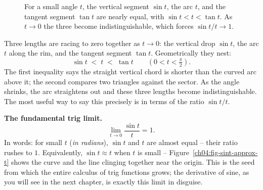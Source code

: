 \begin{figure}[H]
\centering
{}
\caption{For a small angle $t$, the vertical segment $\sin t$, the arc $t$, and the tangent segment $\tan t$ are nearly equal, with $\sin t < t < \tan t$. As $t\to 0$ the three become indistinguishable, which forces $\sin t/t \to 1$.}
\label{ch04:fig-smallangle}
\end{figure}

Three lengths are racing to zero together as $t\to 0$: the vertical drop $\sin t$, the arc $t$ along the rim, and the tangent segment $\tan t$. Geometrically they nest:
\[
  \sin t \;<\; t \;<\; \tan t \qquad (0 < t < \tfrac{\pi}{2}).
\]
The first inequality says the straight vertical chord is shorter than the curved arc above it; the second compares two triangles against the sector. As the angle shrinks, the arc straightens out and these three lengths become indistinguishable. The most useful way to say this precisely is in terms of the ratio $\sin t / t$.

\begin{focusbox}
\textbf{The fundamental trig limit.}
\[
  \boxed{\;\lim_{t\to 0}\frac{\sin t}{t} = 1.\;}
\]
In words: for small $t$ (\emph{in radians}), $\sin t$ and $t$ are almost equal -- their ratio rushes to $1$. Equivalently, $\sin t \approx t$ when $t$ is small -- Figure~\ref{ch04:fig-sint-approx-t} shows the curve and the line clinging together near the origin. This is the seed from which the entire calculus of trig functions grows; the derivative of sine, as you will see in the next chapter, is exactly this limit in disguise.
\end{focusbox}

